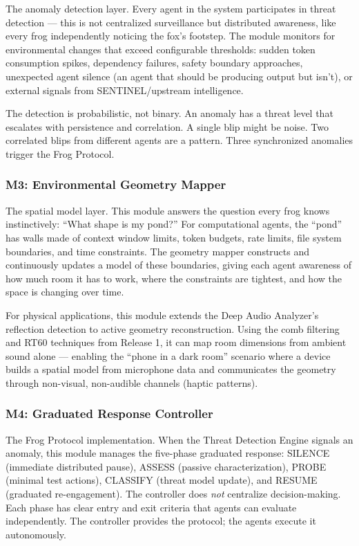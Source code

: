 \documentclass[11pt,letterpaper]{article}
\begin{document}
The anomaly detection layer. Every agent in the system participates in threat detection --- this is not centralized surveillance but distributed awareness, like every frog independently noticing the fox's footstep. The module monitors for environmental changes that exceed configurable thresholds: sudden token consumption spikes, dependency failures, safety boundary approaches, unexpected agent silence (an agent that should be producing output but isn't), or external signals from SENTINEL/upstream intelligence.

The detection is probabilistic, not binary. An anomaly has a threat level that escalates with persistence and correlation. A single blip might be noise. Two correlated blips from different agents are a pattern. Three synchronized anomalies trigger the Frog Protocol.

\subsubsection{M3: Environmental Geometry Mapper}

The spatial model layer. This module answers the question every frog knows instinctively: ``What shape is my pond?'' For computational agents, the ``pond'' has walls made of context window limits, token budgets, rate limits, file system boundaries, and time constraints. The geometry mapper constructs and continuously updates a model of these boundaries, giving each agent awareness of how much room it has to work, where the constraints are tightest, and how the space is changing over time.

For physical applications, this module extends the Deep Audio Analyzer's reflection detection to active geometry reconstruction. Using the comb filtering and RT60 techniques from Release 1, it can map room dimensions from ambient sound alone --- enabling the ``phone in a dark room'' scenario where a device builds a spatial model from microphone data and communicates the geometry through non-visual, non-audible channels (haptic patterns).

\subsubsection{M4: Graduated Response Controller}

The Frog Protocol implementation. When the Threat Detection Engine signals an anomaly, this module manages the five-phase graduated response: SILENCE (immediate distributed pause), ASSESS (passive characterization), PROBE (minimal test actions), CLASSIFY (threat model update), and RESUME (graduated re-engagement). The controller does \textit{not} centralize decision-making. Each phase has clear entry and exit criteria that agents can evaluate independently. The controller provides the protocol; the agents execute it autonomously.
\end{document}

